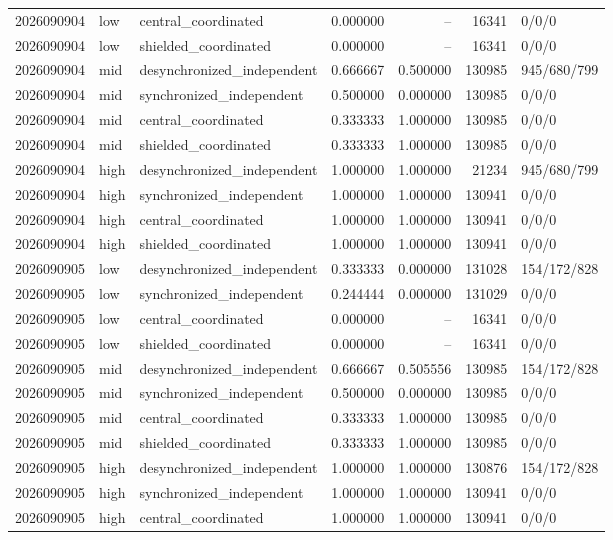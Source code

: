 \begin{longtable}{llp{38mm}rrrp{30mm}}
2026090904 & low & central\_coordinated & 0.000000 & -- & 16341 & 0/0/0 \\
2026090904 & low & shielded\_coordinated & 0.000000 & -- & 16341 & 0/0/0 \\
2026090904 & mid & desynchronized\_independent & 0.666667 & 0.500000 & 130985 & 945/680/799 \\
2026090904 & mid & synchronized\_independent & 0.500000 & 0.000000 & 130985 & 0/0/0 \\
2026090904 & mid & central\_coordinated & 0.333333 & 1.000000 & 130985 & 0/0/0 \\
2026090904 & mid & shielded\_coordinated & 0.333333 & 1.000000 & 130985 & 0/0/0 \\
2026090904 & high & desynchronized\_independent & 1.000000 & 1.000000 & 21234 & 945/680/799 \\
2026090904 & high & synchronized\_independent & 1.000000 & 1.000000 & 130941 & 0/0/0 \\
2026090904 & high & central\_coordinated & 1.000000 & 1.000000 & 130941 & 0/0/0 \\
2026090904 & high & shielded\_coordinated & 1.000000 & 1.000000 & 130941 & 0/0/0 \\
2026090905 & low & desynchronized\_independent & 0.333333 & 0.000000 & 131028 & 154/172/828 \\
2026090905 & low & synchronized\_independent & 0.244444 & 0.000000 & 131029 & 0/0/0 \\
2026090905 & low & central\_coordinated & 0.000000 & -- & 16341 & 0/0/0 \\
2026090905 & low & shielded\_coordinated & 0.000000 & -- & 16341 & 0/0/0 \\
2026090905 & mid & desynchronized\_independent & 0.666667 & 0.505556 & 130985 & 154/172/828 \\
2026090905 & mid & synchronized\_independent & 0.500000 & 0.000000 & 130985 & 0/0/0 \\
2026090905 & mid & central\_coordinated & 0.333333 & 1.000000 & 130985 & 0/0/0 \\
2026090905 & mid & shielded\_coordinated & 0.333333 & 1.000000 & 130985 & 0/0/0 \\
2026090905 & high & desynchronized\_independent & 1.000000 & 1.000000 & 130876 & 154/172/828 \\
2026090905 & high & synchronized\_independent & 1.000000 & 1.000000 & 130941 & 0/0/0 \\
2026090905 & high & central\_coordinated & 1.000000 & 1.000000 & 130941 & 0/0/0 \\

\end{longtable}
